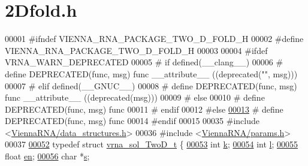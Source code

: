 \hypertarget{2_dfold_8h_source}{}\section{2\+Dfold.h}
\label{2_dfold_8h_source}

\begin{DoxyCode}
00001 \textcolor{preprocessor}{#ifndef VIENNA\_RNA\_PACKAGE\_TWO\_D\_FOLD\_H}
00002 \textcolor{preprocessor}{#define VIENNA\_RNA\_PACKAGE\_TWO\_D\_FOLD\_H}
00003 
00004 \textcolor{preprocessor}{#ifdef VRNA\_WARN\_DEPRECATED}
00005 \textcolor{preprocessor}{# if defined(\_\_clang\_\_)}
00006 \textcolor{preprocessor}{#  define DEPRECATED(func, msg) func \_\_attribute\_\_ ((deprecated("", msg)))}
00007 \textcolor{preprocessor}{# elif defined(\_\_GNUC\_\_)}
00008 \textcolor{preprocessor}{#  define DEPRECATED(func, msg) func \_\_attribute\_\_ ((deprecated(msg)))}
00009 \textcolor{preprocessor}{# else}
00010 \textcolor{preprocessor}{#  define DEPRECATED(func, msg) func}
00011 \textcolor{preprocessor}{# endif}
00012 \textcolor{preprocessor}{#else}
\mbox{\hyperlink{2_dfold_8h_aab347a3c03fbe8e7319551b9fa0cce4a}{00013}} \textcolor{preprocessor}{# define DEPRECATED(func, msg) func}
00014 \textcolor{preprocessor}{#endif}
00015 
00035 \textcolor{preprocessor}{#include <\mbox{\hyperlink{data__structures_8h}{ViennaRNA/data\_structures.h}}>}
00036 \textcolor{preprocessor}{#include <\mbox{\hyperlink{params_8h}{ViennaRNA/params.h}}>}
00037 
\mbox{\hyperlink{group__kl__neighborhood__mfe}{00052}} \textcolor{keyword}{typedef} \textcolor{keyword}{struct }\mbox{\hyperlink{group__kl__neighborhood__mfe_structvrna__sol___two_d__t}{vrna\_sol\_TwoD\_t}} \{
\mbox{\hyperlink{group__kl__neighborhood__mfe_ac111e850bb3b3a11b6b5707912cfa1b8}{00053}}   \textcolor{keywordtype}{int}   \mbox{\hyperlink{group__kl__neighborhood__mfe_ac111e850bb3b3a11b6b5707912cfa1b8}{k}};        
\mbox{\hyperlink{group__kl__neighborhood__mfe_ab8e95cd920901175a2cc8de726ab1d36}{00054}}   \textcolor{keywordtype}{int}   \mbox{\hyperlink{group__kl__neighborhood__mfe_ab8e95cd920901175a2cc8de726ab1d36}{l}};        
\mbox{\hyperlink{group__kl__neighborhood__mfe_a7577863a6a84224dfee39b321c03cab1}{00055}}   \textcolor{keywordtype}{float} \mbox{\hyperlink{group__kl__neighborhood__mfe_a7577863a6a84224dfee39b321c03cab1}{en}};       
\mbox{\hyperlink{group__kl__neighborhood__mfe_ac5942d2505a6cd7e4a8073a321d5d2d5}{00056}}   \textcolor{keywordtype}{char}  *\mbox{\hyperlink{group__kl__neighborhood__mfe_ac5942d2505a6cd7e4a8073a321d5d2d5}{s}};       

\end{DoxyCode}
